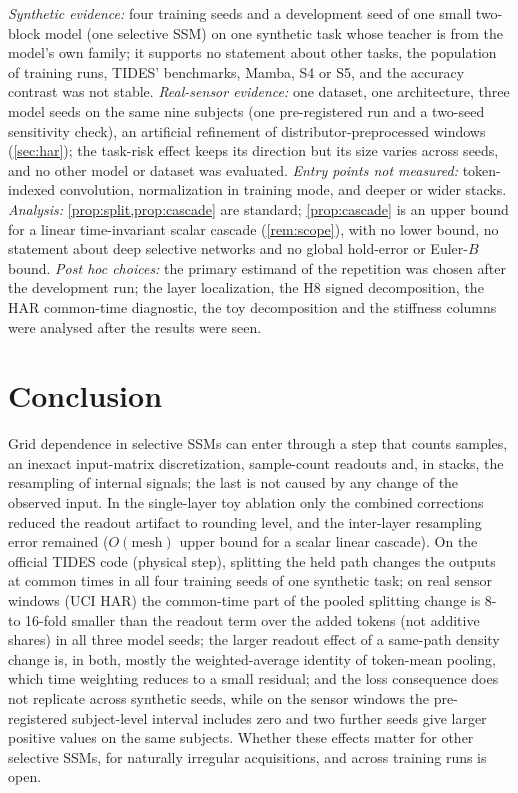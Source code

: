 \documentclass{article}
\theoremstyle{plain}
\theoremstyle{definition}
\theoremstyle{remark}
\begin{document}
\emph{Synthetic evidence:} four training seeds and a development seed of one small two-block model (one selective SSM) on one synthetic task whose teacher is from the model's own family; it supports no statement about other tasks, the population of training runs, TIDES' benchmarks, Mamba, S4 or S5, and the accuracy contrast was not stable. \emph{Real-sensor evidence:} one dataset, one architecture, three model seeds on the same nine subjects (one pre-registered run and a two-seed sensitivity check), an artificial refinement of distributor-preprocessed windows (\cref{sec:har}); the task-risk effect keeps its direction but its size varies across seeds, and no other model or dataset was evaluated.
\emph{Entry points not measured:} token-indexed convolution, normalization in training mode, and deeper or wider stacks.
\emph{Analysis:} \cref{prop:split,prop:cascade} are standard; \cref{prop:cascade} is an upper bound for a linear time-invariant scalar cascade (\cref{rem:scope}), with no lower bound, no statement about deep selective networks and no global hold-error or Euler-$B$ bound.
\emph{Post hoc choices:} the primary estimand of the repetition was chosen after the development run; the layer localization, the H8 signed decomposition, the HAR common-time diagnostic, the toy decomposition and the stiffness columns were analysed after the results were seen.

\section{Conclusion}
\label{sec:conclusion}

Grid dependence in selective SSMs can enter through a step that counts samples, an inexact input-matrix discretization, sample-count readouts and, in stacks, the resampling of internal signals; the last is not caused by any change of the observed input.
In the single-layer toy ablation only the combined corrections reduced the readout artifact to rounding level, and the inter-layer resampling error remained ($O(\text{mesh})$ upper bound for a scalar linear cascade).
On the official TIDES code (physical step), splitting the held path changes the outputs at common times in all four training seeds of one synthetic task; on real sensor windows (UCI HAR) the common-time part of the pooled splitting change is 8- to 16-fold smaller than the readout term over the added tokens (not additive shares) in all three model seeds; the larger readout effect of a same-path density change is, in both, mostly the weighted-average identity of token-mean pooling, which time weighting reduces to a small residual; and the loss consequence does not replicate across synthetic seeds, while on the sensor windows the pre-registered subject-level interval includes zero and two further seeds give larger positive values on the same subjects.
Whether these effects matter for other selective SSMs, for naturally irregular acquisitions, and across training runs is open.\label{body-end}
\end{document}
